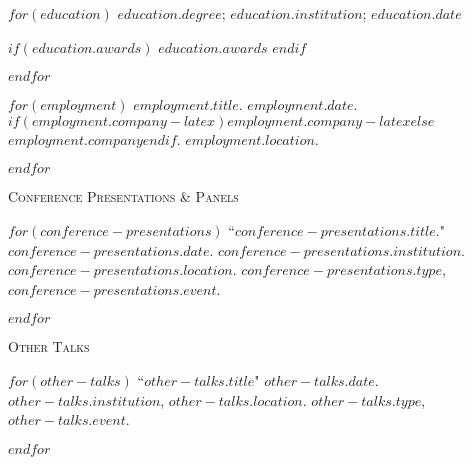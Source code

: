 \documentclass[11pt,article,oneside]{memoir}
\begin{document}
\medskip

\reversemarginpar

\bigskip

%
%

\medskip
{}

$for(education)$
\ind $education.degree$; $education.institution$; $education.date$

$if(education.awards)$
\ind \hspace{0.35in} \footnotesize $education.awards$ \normalsize \vspace{0.05in}
$endif$

\medskip
$endfor$

\medskip

\medskip
{}

$for(employment)$
\ind $employment.title$. \emph{$employment.date$}. $if(employment.company-latex)$$employment.company-latex$$else$$employment.company$$endif$. $employment.location$.

\smallskip
$endfor$

\medskip

\medskip
{}

\ind \textsc{Conference Presentations \& Panels}

\medskip

$for(conference-presentations)$
\ind ``$conference-presentations.title$." \emph{$conference-presentations.date$}. $conference-presentations.institution$. $conference-presentations.location$. $conference-presentations.type$, \emph{$conference-presentations.event$}. \normalsize

\smallskip

\pagebreak[1]
$endfor$
\bigskip

\ind \textsc{Other Talks}

\medskip

$for(other-talks)$
\ind ``$other-talks.title$" \emph{$other-talks.date$}. $other-talks.institution$, $other-talks.location$. $other-talks.type$, \emph{$other-talks.event$}.

\smallskip

\pagebreak[1]
$endfor$
\end{document}
